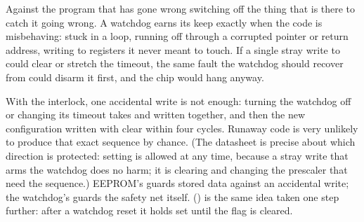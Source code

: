 
Against the program that has gone wrong switching off the thing that is there to catch it going
wrong. A watchdog earns its keep exactly when the code is misbehaving: stuck in a loop, running off
through a corrupted pointer or return address, writing to registers it never meant to touch. If a
single stray write to  could clear  or stretch the timeout, the same fault
the watchdog should recover from could disarm it first, and the chip would hang anyway.

With the interlock, one accidental write is not enough: turning the watchdog off or changing its
timeout takes  and  written together, and then the new configuration written
with  clear within four cycles. Runaway code is very unlikely to produce that exact
sequence by chance. (The datasheet is precise about which direction is protected: setting
 is allowed at any time, because a stray write that arms the watchdog does no harm; it is
clearing  and changing the prescaler that need the sequence.) EEPROM's 
guards stored data against an accidental write; the watchdog's  guards the safety net
itself.  () is the same idea taken one step further: after a watchdog
reset it holds  set until the flag is cleared.
